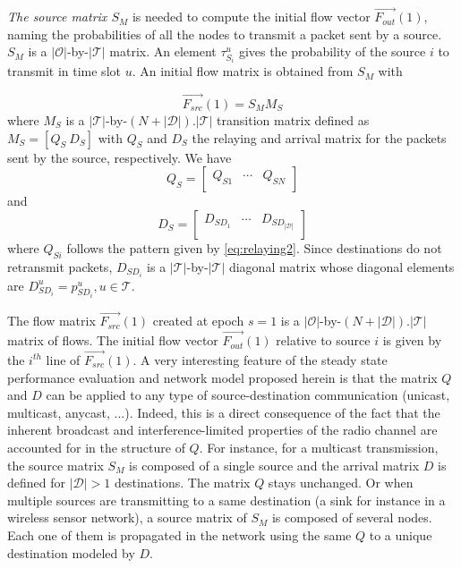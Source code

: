 \documentclass[a4paper]{article}
\newcommand{\T}{\mathcal{T}}
\newcommand{\Orig}{\mathcal{O}}
\newcommand{\D}{\mathcal{D}}
\newcommand{\Fout}[3]{\overrightarrow{ F_{#1}^{#2}}(#3)}
\newcommand{\Mmatrix}{M}
\newcommand{\Qmatrix}{Q}
\newcommand{\Rmatrix}{D}
\newcommand{\Smatrix}{S_M}
\newcommand{\Msrc}{\Mmatrix_S}
\newcommand{\Qsrc}{\Qmatrix_S}
\newcommand{\Rsrc}{\Rmatrix_S}
\newcommand{\Qe}[4]{\Qmatrix_{#1#2}^{#3#4}}
\newcommand{\Qd}[4]{\Rmatrix_{#1#2}^{#3#4}}
\begin{document}
\emph{The source matrix $\Smatrix$} is needed to compute the initial flow vector $\Fout{out}{}{1}$, naming the probabilities of all the nodes to transmit a packet sent by a source. $\Smatrix$ is a $|\Orig|$-by-$|\T|$ matrix. An element $\tau_{S_{i}}^u$ gives the probability of the source $i$ to transmit in time slot $u$. An initial flow matrix is obtained from $\Smatrix$ with

\[
\Fout{src}{}{1} = \Smatrix \Msrc
\]       
\noindent where $\Msrc$ is a $|\T|$-by-$(N+|\D|).|\T|$ transition matrix defined as $\Msrc=\left[ \Qsrc ~ \Rsrc \right]$ with $\Qsrc$ and $\Rsrc$ the relaying and arrival matrix for the packets sent by the source, respectively. We have 
\[
\Qsrc =  \left[
\begin{array}{ccc}
\Qe{S}{1}{}{}	& \cdots 	& 	\Qe{S}{N}{}{} \\
\end{array}
\right]
\]       
\noindent and 
\[
\Rsrc =  \left[
\begin{array}{ccc}
\Qd{S}{D_1}{}{}	& \cdots 	& 	\Qd{S}{D_{|\D|}}{}{} \\
\end{array}
\right]
\]       
\noindent where $\Qe{S}{i}{}{}$ follows the pattern given by \eqref{eq:relaying2}. Since destinations do not retransmit packets, $D_{SD_i}$ is a $|\T|$-by-$|\T|$ diagonal matrix whose diagonal elements are $D_{SD_i}^u = p_{SD_i}^u, u \in \T$.

The flow matrix $\Fout{src}{}{1}$ created at epoch $s=1$ is a $|\Orig|$-by-$(N+|\D|).|\T|$ matrix of flows. The initial flow vector $\Fout{out}{}{1}$ relative to source $i$ is given by the $i^{th}$ line of $\Fout{src}{}{1}$. 
A very interesting feature of the steady state performance evaluation and network model proposed herein is that the matrix $\Qmatrix$ and $\Rmatrix$ can be applied to any type of source-destination communication (unicast, multicast, anycast, ...). Indeed, this is a direct consequence of the fact that the inherent broadcast and interference-limited properties of the radio channel are accounted for in the structure of $\Qmatrix$.  
For instance, for a multicast transmission, the source matrix $\Smatrix$ is composed of a single source and the arrival matrix  $\Rmatrix$ is defined for  $|\D|>1$ destinations. The matrix $\Qmatrix$ stays unchanged.
Or when multiple sources are transmitting to a same destination (a sink for instance in a wireless sensor network), a source matrix of $\Smatrix$ is composed of several nodes. Each one of them is propagated in the network using the same $\Qmatrix$ to a unique destination modeled by $\Rmatrix$.  
\end{document}
